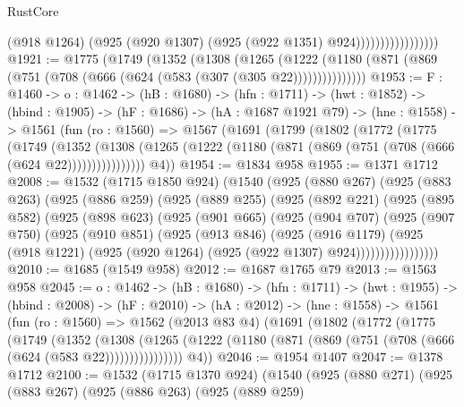 \begin{lexlean}{RustCore}
\begin{coremodule}
                                  (@918 @1264)
                                  (@925 (@920 @1307) (@925 (@922 @1351) @924)))))))))))))))))
@1921 := @1775
    (@1749
      (@1352
        (@1308
          (@1265
            (@1222 (@1180 (@871 (@869 (@751 (@708 (@666 (@624 (@583 (@307 (@305 @22)))))))))))))))
@1953 := {F : @1460} ->
  {o : @1462} ->
  (hB : @1680) ->
  (hfn : @1711) ->
  (hwt : @1852) ->
  (hbind : @1905) ->
  (hF : @1686) ->
  (hA : @1687 @1921 @79) ->
  (hne : @1558) ->
  @1561
    (fun (ro : @1560) =>
    @1567
      (@1691
        (@1799
          (@1802
            (@1772
              (@1775
                (@1749
                  (@1352
                    (@1308
                      (@1265 (@1222 (@1180 (@871 (@869 (@751 (@708 (@666 (@624 @22))))))))))))))))
        @4))
@1954 := @1834 @958
@1955 := @1371 @1712
@2008 := @1532
    (@1715 @1850 @924)
    (@1540
      (@925
        (@880 @267)
        (@925
          (@883 @263)
          (@925
            (@886 @259)
            (@925
              (@889 @255)
              (@925
                (@892 @221)
                (@925
                  (@895 @582)
                  (@925
                    (@898 @623)
                    (@925
                      (@901 @665)
                      (@925
                        (@904 @707)
                        (@925
                          (@907 @750)
                          (@925
                            (@910 @851)
                            (@925
                              (@913 @846)
                              (@925
                                (@916 @1179)
                                (@925
                                  (@918 @1221)
                                  (@925 (@920 @1264) (@925 (@922 @1307) @924)))))))))))))))))
@2010 := @1685 (@1549 @958)
@2012 := @1687 @1765 @79
@2013 := @1563 @958
@2045 := {o : @1462} ->
  (hB : @1680) ->
  (hfn : @1711) ->
  (hwt : @1955) ->
  (hbind : @2008) ->
  (hF : @2010) ->
  (hA : @2012) ->
  (hne : @1558) ->
  @1561
    (fun (ro : @1560) =>
    @1562
      (@2013 @83 @4)
      (@1691
        (@1802
          (@1772
            (@1775
              (@1749
                (@1352
                  (@1308
                    (@1265
                      (@1222 (@1180 (@871 (@869 (@751 (@708 (@666 (@624 (@583 @22))))))))))))))))
        @4))
@2046 := @1954 @1407
@2047 := @1378 @1712
@2100 := @1532
    (@1715 @1370 @924)
    (@1540
      (@925
        (@880 @271)
        (@925
          (@883 @267)
          (@925
            (@886 @263)
            (@925
              (@889 @259)

\end{coremodule}
\end{lexlean}
